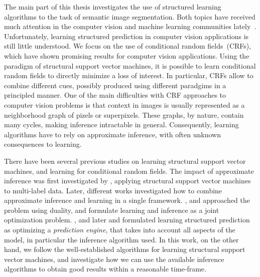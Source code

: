 The main part of this thesis investigates the use of structured learning~\citep{taskar2003max, tsochantaridis2006large}
algorithms to the task of semantic image segmentation. Both topics have received
much attention in the computer vision and machine learning communities
lately~\citep{ladicky2009associative, krahenbuhl2012efficient,
branson2013efficient, blake2011markov}.
Unfortunately, learning structured prediction in computer vision applications
is still little understood.
We focus on the use of conditional random fields~(CRFs), which have shown
promising  results for computer vision applications. Using the paradigm of structural
support vector machines, it is possible to learn conditional random fields to
directly minimize a loss of interest. In particular, CRFs
allow to combine different cues, possibly produced using different paradgims in a
principled manner. One of the main difficulties with CRF approaches to computer
vision problems is that context in images is usually represented as a
neighborhood graph of pizels or superpixels.  These graphs, by nature, contain many cycles, making
inference intractable in general. Consequently, learning algorithms have to
rely on approximate inference, with often unknown consequences to learning.

There have been several previous studies on learning structural support vector
machines, and learning for conditional random fields. The impact of approximate
inference was first investigated by \citet{finley2008training}, applying
structural support vector machines to multi-label data. Later, different works
investigated how to combine approximate inference and learning in a single
framework. \citet{meshi2010learning, komodakis2011efficient}, and
\citet{hazan2010primal} approached the problem using duality, and formulate
learning and inference as a joint optimization problem.
\citet{stoyanov2011empirical}, and later \citet{jancsarylearning} and
\citet{krahenbuhlparameter} formulated learning structured prediction as
optimizing a \emph{prediction engine}, that takes into account all aspects of
the model, in particular the inference algorithm used.
In this work, on the other hand, we follow the well-established algorithms for
learning structural support vector machines, and investigate how we can use the
available inference algorithms to obtain good results within a reasonable
time-frame.

